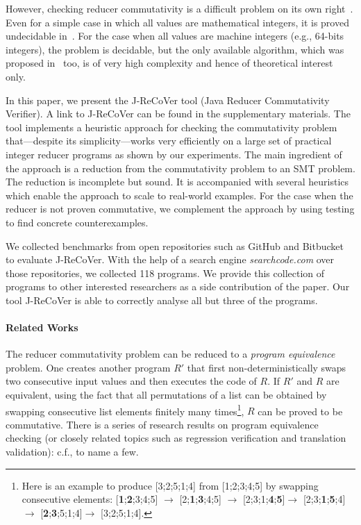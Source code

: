 \documentclass{llncs}
\begin{document}
However, checking reducer commutativity is a difficult problem on its own
right~\cite{ChenHSW15,ChenSW16,ChenLTW17}. Even for a simple case in which all
values are mathematical integers, it is proved undecidable in~\cite{ChenHSW15}.
For the case when all values are machine integers (e.g., 64-bits integers), the
problem is decidable, but the only available algorithm, which was proposed
in~\cite{ChenHSW15} too, is of very high complexity and hence of theoretical
interest only.

In this paper, we present the J-ReCoVer tool (Java Reducer Commutativity
Verifier). A link to J-ReCoVer can be found in the supplementary materials. The
tool implements a heuristic approach for checking the commutativity problem
that---despite its simplicity---works very efficiently on a large set of
practical integer reducer programs as shown by our experiments. The main
ingredient of the approach is a reduction from the commutativity problem to an
SMT problem. The reduction is incomplete but sound. It is accompanied with
several heuristics which enable the approach to scale to real-world examples.
For the case when the reducer is not proven commutative, we complement the
approach by using testing to find concrete counterexamples.

We collected benchmarks from open repositories such as GitHub and Bitbucket to
evaluate J-ReCoVer. With the help of a search engine \emph{searchcode.com} over
those repositories, we collected 118 programs. We provide this collection of
programs to other interested researchers as a side contribution of the paper.
Our tool J-ReCoVer is able to correctly analyse all but three of the programs.

\paragraph*{Related Works}

The reducer commutativity problem can be reduced to a \emph{program equivalence}
problem. One creates another program $R'$ that first non-deterministically swaps
two consecutive input values and then executes the code of $R$. If $R'$ and $R$
are equivalent, using the fact that all permutations of a list can be obtained
by swapping consecutive list elements finitely many times\footnote{Here is an
example to produce [3;2;5;1;4] from [1;2;3;4;5] by swapping consecutive
elements: [\textbf{1};\textbf{2};3;4;5] $\rightarrow$
[2;\textbf{1};\textbf{3};4;5] $\rightarrow$
[2;3;1;\textbf{4};\textbf{5}]$\rightarrow$
[2;3;\textbf{1};\textbf{5};4]$\rightarrow$
[\textbf{2};\textbf{3};5;1;4]$\rightarrow$ [3;2;5;1;4].}, $R$ can be proved to
be commutative. There is a series of research results on program equivalence
checking (or closely related topics such as regression verification and
translation validation): c.f.,
\cite{Pnueli:1998:TV,fedyukovich2015automated,barthe2011relational,KlebanovRuemmerUlbrich2017}
to name a few. 
\end{document}
